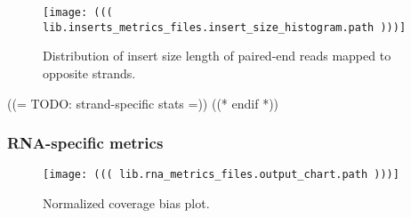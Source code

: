 {
    \begin{figure}[h!]
        \centering
        \texttt{[image: ((( lib.inserts\_metrics\_files.insert\_size\_histogram.path )))]}
        \caption{Distribution of insert size length of paired-end reads mapped to opposite strands.}
    \end{figure}
}
((= TODO: strand-specific stats
=))
((* endif *))

\subsubsection{RNA-specific metrics}

{
    \begin{figure}[h!]
        \centering
        \texttt{[image: ((( lib.rna\_metrics\_files.output\_chart.path )))]}
        \caption{Normalized coverage bias plot.}
    \end{figure}
}

